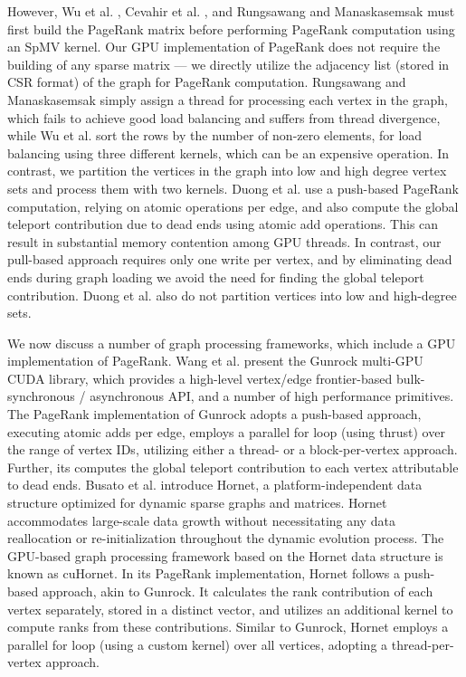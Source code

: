However, Wu et al. \cite{rank-wu10}, Cevahir et al. \cite{cevahir2010efficient}, and Rungsawang and Manaskasemsak \cite{rank-rungsawang12} must first build the PageRank matrix before performing PageRank computation using an SpMV kernel. Our GPU implementation of PageRank does not require the building of any sparse matrix --- we directly utilize the adjacency list (stored in CSR format) of the graph for PageRank computation. Rungsawang and Manaskasemsak \cite{rank-rungsawang12} simply assign a thread for processing each vertex in the graph, which fails to achieve good load balancing and suffers from thread divergence, while Wu et al. \cite{rank-wu10} sort the rows by the number of non-zero elements, for load balancing using three different kernels, which can be an expensive operation. In contrast, we partition the vertices in the graph into low and high degree vertex sets and process them with two kernels.
Duong et al. \cite{rank-duong12} use a push-based PageRank computation, relying on atomic operations per edge, and also compute the global teleport contribution due to dead ends using atomic add operations. This can result in substantial memory contention among GPU threads. In contrast, our pull-based approach requires only one write per vertex, and by eliminating dead ends during graph loading we avoid the need for finding the global teleport contribution. Duong et al. \cite{rank-duong12} also do not partition vertices into low and high-degree sets.

We now discuss a number of graph processing frameworks, which include a GPU implementation of PageRank. Wang et al. \cite{wang2016gunrock} present the Gunrock multi-GPU CUDA library, which provides a high-level vertex/edge frontier-based bulk-synchronous / asynchronous API, and a number of high performance primitives. The PageRank implementation of Gunrock adopts a push-based approach, executing atomic adds per edge, employs a parallel for loop (using thrust) over the range of vertex IDs, utilizing either a thread- or a block-per-vertex approach. Further, its computes the global teleport contribution to each vertex attributable to dead ends. Busato et al. \cite{busato2018hornet} introduce Hornet, a platform-independent data structure optimized for dynamic sparse graphs and matrices. Hornet accommodates large-scale data growth without necessitating any data reallocation or re-initialization throughout the dynamic evolution process. The GPU-based graph processing framework based on the Hornet data structure is known as cuHornet. In its PageRank implementation, Hornet follows a push-based approach, akin to Gunrock. It calculates the rank contribution of each vertex separately, stored in a distinct vector, and utilizes an additional kernel to compute ranks from these contributions. Similar to Gunrock, Hornet employs a parallel for loop (using a custom kernel) over all vertices, adopting a thread-per-vertex approach.

